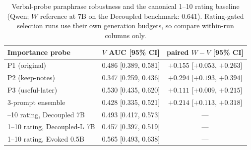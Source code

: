 \begin{table}[h]
\centering
\caption{Verbal-probe paraphrase robustness and the canonical 1--10 rating
baseline (Qwen; $W$ reference at 7B on the Decoupled benchmark: 0.641).
Rating-gated selection runs use their own generation budgets, so compare
within-run columns only.}
\label{tab:appA11}
\small
\begin{tabular}{lcc}
\toprule
Importance probe & $V$ AUC [95\% CI] & paired $W-V$ [95\% CI] \\
\midrule
P1 (original) & 0.486 [0.389, 0.581] & $+0.155$ [$+0.053$, $+0.263$] \\
P2 (keep-notes) & 0.347 [0.259, 0.436] & $+0.294$ [$+0.193$, $+0.394$] \\
P3 (useful-later) & 0.530 [0.435, 0.620] & $+0.111$ [$+0.009$, $+0.215$] \\
3-prompt ensemble & 0.428 [0.335, 0.521] & $+0.214$ [$+0.113$, $+0.318$] \\
\addlinespace
1--10 rating, Decoupled 7B & 0.493 [0.417, 0.573] & --- \\
1--10 rating, Decoupled-L 7B & 0.457 [0.397, 0.519] & --- \\
1--10 rating, Evoked 0.5B & 0.565 [0.493, 0.638] & --- \\
\bottomrule
\end{tabular}
\end{table}
